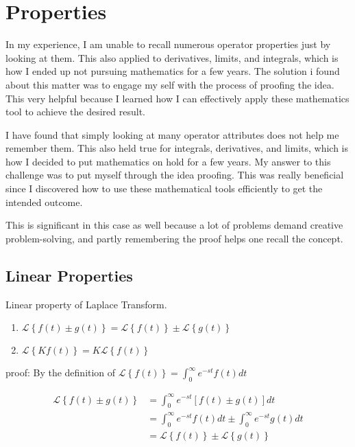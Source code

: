 \chapter{Properties}
    In my experience, I am unable to recall numerous operator properties just by looking at them. This also applied to derivatives, limits, and integrals, which is how I ended up not pursuing mathematics for a few years. The solution i found about this matter was to engage my self with the process of proofing the idea. This very helpful because I learned how I can effectively apply these mathematics tool to achieve the desired result.

    I have found that simply looking at many operator attributes does not help me remember them. This also held true for integrals, derivatives, and limits, which is how I decided to put mathematics on hold for a few years. My answer to this challenge was to put myself through the idea proofing. This was really beneficial since I discovered how to use these mathematical tools efficiently to get the intended outcome.

    This is significant in this case as well because a lot of problems demand  creative problem-solving, and partly remembering the proof helps one recall the concept.

    \section{Linear Properties}
        Linear property of Laplace Transform.
        \begin{enumerate}
            \item $\mathcal{L}\left\{f(t)\pm g(t)\right\}=\mathcal{L}\left\{f(t)\right\}\pm \mathcal{L}\left\{g(t)\right\}$
            \item $\mathcal{L}\left\{Kf(t)\right\}=K\mathcal{L}\left\{f(t)\right\}$
        \end{enumerate}


        proof: By the definition of $\mathcal{L}\left\{f(t)\right\}=\int_{0}^{\infty}e^{-st}f(t)dt$

        \begin{align*}
            \displaystyle
            \mathcal{L}\left\{f(t)\pm g(t)\right\}&=\int_{0}^{\infty}e^{-st}[f(t)\pm g(t)]dt\\
            &=\int_{0}^{\infty}e^{-st}f(t)dt\pm\int_{0}^{\infty}e^{-st}g(t)dt\\
            &=\mathcal{L}\left\{f(t)\right\}\pm \mathcal{L}\left\{g(t)\right\}
        \end{align*}

